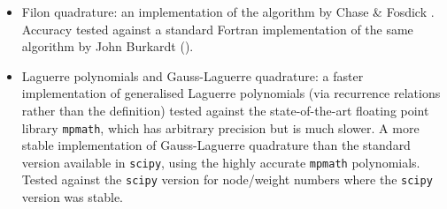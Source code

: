\documentclass{article}
\newcommand{\1}{\mathbf{1}} %
\begin{document}
\begin{itemize}
  \item Filon quadrature: an implementation of the algorithm by Chase \& Fosdick
    \cite{chase1969algorithm}. Accuracy tested against a standard Fortran implementation
    of the same algorithm by John Burkardt (\cite{burkardt2014filon}).
  \item Laguerre polynomials and Gauss-Laguerre quadrature: a faster implementation
    of generalised Laguerre polynomials (via recurrence relations rather than the definition)
    tested against the state-of-the-art floating point library \texttt{mpmath}, which has
    arbitrary precision but is much slower.
    A more stable implementation of Gauss-Laguerre quadrature
    than the standard version available in \texttt{scipy}, 
    using the highly accurate \texttt{mpmath} polynomials. Tested against the \texttt{scipy}
    version for node/weight numbers where the \texttt{scipy} version was stable.
\end{itemize}

\clearpage
\printbibliography[heading=bibintoc]
\printindex
{}
\cleardoublepage
{}
\listoftheorems[ignoreall,show={definition,lemma,theorem,proposition},
title={List of Definitions and Theorems},
swapnumber]
\end{document}
